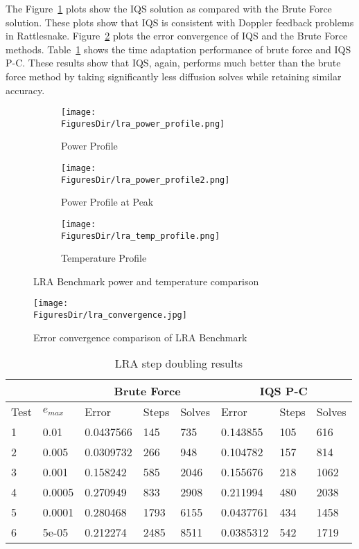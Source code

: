 \documentclass[12pt]{scrartcl}
\newcommand{\fig}[1]{Figure~\ref{#1}}                      %
\newcommand{\tbl}[1]{Table~\ref{#1}}                     %
\newcommand{\FiguresDir}{./figs}
\begin{document}
The \fig{fig:LRA_plots} plots show the IQS  solution as compared with the Brute Force solution.    These plots show that IQS is consistent with Doppler feedback problems in Rattlesnake.  \fig{fig:lra_conv} plots the error convergence of IQS and the Brute Force methods. \tbl{tab:LRAdt2} shows the time adaptation performance of brute force and IQS P-C.  These results show that IQS, again, performs much better than the brute force method by taking significantly less diffusion solves while retaining similar accuracy.

\begin{figure}[!htbp]
\begin{center}
\begin{subfigure}[!htbp]{0.49\textwidth}
\texttt{[image: \\FiguresDir/lra\_power\_profile.png]}
\caption{Power Profile}
\end{subfigure}
\begin{subfigure}[!htbp]{0.49\textwidth}
\texttt{[image: \\FiguresDir/lra\_power\_profile2.png]}
\caption{Power Profile at Peak}
\end{subfigure}
\begin{subfigure}[!htbp]{0.49\textwidth}
\texttt{[image: \\FiguresDir/lra\_temp\_profile.png]}
\caption{Temperature Profile}
\end{subfigure}
\caption{LRA Benchmark power and temperature comparison}
\label{fig:LRA_plots}
\end{center}
\end{figure}

\begin{figure}[!htbp]
\centering
\texttt{[image: \\FiguresDir/lra\_convergence.jpg]}
\caption{Error convergence comparison of LRA Benchmark}
\label{fig:lra_conv}
\end{figure}

\begin{table}[!htbp]
\caption{LRA step doubling results}
\label{tab:LRAdt2}
\begin{center}
\begin{tabular}{|l|l|l|l|l|l|l|l|}
\hline
  &  & \multicolumn{3}{|c|}{Brute Force} & \multicolumn{3}{|c|}{IQS P-C} \\
\hline
Test & $e_{max}$ & Error & Steps & Solves & Error & Steps & Solves \\
\hline
1 &	 0.01 &	 0.0437566 &	 145 &	 735 &	 0.143855 &	 105 &	 616 \\ 
2 &	 0.005 &	 0.0309732 &	 266 &	 948 &	 0.104782 &	 157 &	 814 \\ 
3 &	 0.001 &	 0.158242 &	 585 &	 2046 &	 0.155676 &	 218 &	 1062 \\ 
4 &	 0.0005 &	 0.270949 &	 833 &	 2908 &	 0.211994 &	 480 &	 2038 \\ 
5 &	 0.0001 &	 0.280468 &	 1793 &	 6155 &	 0.0437761 &	 434 &	 1458 \\ 
6 &	 5e-05 &	 0.212274 &	 2485 &	 8511 &	 0.0385312 &	 542 &	 1719 \\ 
\hline
\end{tabular}
\end{center}
\end{table}
\end{document}
